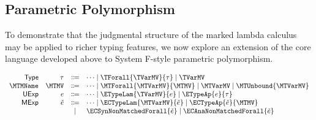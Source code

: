 \subsection{Parametric Polymorphism}
\label{sec:calculus-polymorphism}

To demonstrate that the judgmental structure of the marked lambda calculus may be applied to richer typing features, we now explore an extension of the core language developed above to System F-style parametric polymorphism.

\[\begin{array}{rrcl}
  \TMName  & \TMV  & \Coloneqq & \cdots \mid \TForall{\TVarMV}{\TMV} \mid \TVarMV \\
  \MTMName & \MTMV & \Coloneqq & \cdots
                     \mid \MTForall{\MTVarMV}{\MTMV} \mid \MTVarMV \mid \MTUnbound{\MTVarMV} \\
  \EMName  & \EMV  & \Coloneqq & \cdots \mid \ETypeLam{\TVarMV}{\EMV} \mid \ETypeAp{\EMV}{\TMV} \\
  \ECMName & \ECMV & \Coloneqq & \cdots \mid \ECTypeLam{\MTVarMV}{\ECMV} \mid \ECTypeAp{\ECMV}{\MTMV} \\
           &       & \mid      & \ECSynNonMatchedForall{\ECMV} \mid \ECAnaNonMatchedForall{\ECMV}
\end{array}\]